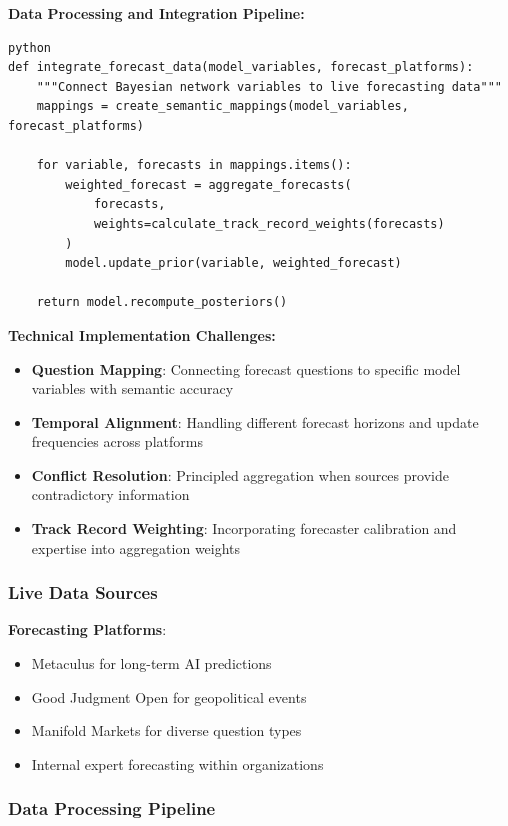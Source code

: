 \documentclass[
  11pt,
  letterpaper,
]{book}
\providecommand{\tightlist}{%
  \setlength{\itemsep}{0pt}\setlength{\parskip}{0pt}}
\begin{document}
\textbf{Data Processing and Integration Pipeline:}

\begin{verbatim}
python
def integrate_forecast_data(model_variables, forecast_platforms):
    """Connect Bayesian network variables to live forecasting data"""
    mappings = create_semantic_mappings(model_variables, forecast_platforms)
    
    for variable, forecasts in mappings.items():
        weighted_forecast = aggregate_forecasts(
            forecasts, 
            weights=calculate_track_record_weights(forecasts)
        )
        model.update_prior(variable, weighted_forecast)
    
    return model.recompute_posteriors()
\end{verbatim}

\textbf{Technical Implementation Challenges:}

\begin{itemize}
\tightlist
\item
  \textbf{Question Mapping}: Connecting forecast questions to specific
  model variables with semantic accuracy
\item
  \textbf{Temporal Alignment}: Handling different forecast horizons and
  update frequencies across platforms
\item
  \textbf{Conflict Resolution}: Principled aggregation when sources
  provide contradictory information
\item
  \textbf{Track Record Weighting}: Incorporating forecaster calibration
  and expertise into aggregation weights
\end{itemize}

\subsubsection{Live Data Sources}\label{sec-live-data}

\textbf{Forecasting Platforms}:

\begin{itemize}
\tightlist
\item
  Metaculus for long-term AI predictions
\item
  Good Judgment Open for geopolitical events
\item
  Manifold Markets for diverse question types
\item
  Internal expert forecasting within organizations
\end{itemize}

\subsubsection{Data Processing Pipeline}\label{sec-data-processing}
\end{document}
